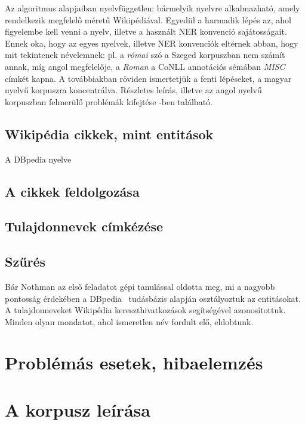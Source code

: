\documentclass{llncs}
\begin{document}
Az algoritmus alapjaiban nyelvfüggetlen: bármelyik nyelvre alkalmazható, amely
rendelkezik megfelelő méretű Wikipédiával. Egyedül a harmadik lépés az, ahol
figyelembe kell venni a nyelv, illetve a használt NER konvenció sajátosságait.
Ennek oka, hogy az egyes nyelvek, illetve NER konvenciók eltérnek abban, hogy
mit tekintenek névelemnek: pl. a \textit{római} szó a Szeged korpuszban nem
számít annak, míg angol megfelelője, a \textit{Roman} a CoNLL annotációs sémában
\textit{MISC} címkét kapna. A továbbiakban röviden ismertetjük a fenti lépéseket,
a magyar nyelvű korpuszra koncentrálva. Részletes leírás, illetve az angol nyelvű
korpuszban felmerülő problémák kifejtése \cite{simon-nemeskey:2012:NEWS2012}-ben
található.


\subsection{Wikipédia cikkek, mint entitások}

A DBpedia nyelve 

\subsection{A cikkek feldolgozása}
\subsection{Tulajdonnevek címkézése}

\subsection{Szűrés}

Bár Nothman az első feladatot gépi tanulással oldotta meg, mi a nagyobb
pontosság érdekében a DBpedia~\cite{Bizer:09} tudásbázis alapján osztályoztuk az
entitásokat. A tulajdonneveket Wikipédia kereszthivatkozások segítségével azonosítottuk.
Minden olyan mondatot, ahol ismeretlen név fordult elő, eldobtunk.

\section{Problémás esetek, hibaelemzés}

\section{A korpusz leírása}
\end{document}
